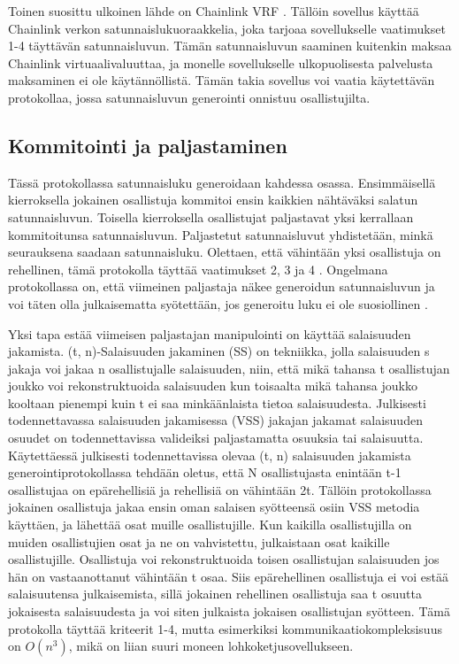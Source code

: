 \documentclass{article}
\begin{document}
Toinen suosittu ulkoinen lähde on Chainlink VRF \cite{noauthor_verifiable_2020}. Tällöin sovellus käyttää Chainlink verkon satunnaislukuoraakkelia, joka tarjoaa sovellukselle vaatimukset 1-4 täyttävän satunnaisluvun. Tämän satunnaisluvun saaminen kuitenkin maksaa Chainlink virtuaalivaluuttaa, ja monelle sovellukselle ulkopuolisesta palvelusta maksaminen ei ole käytännöllistä. Tämän takia sovellus voi vaatia käytettävän protokollaa, jossa satunnaisluvun generointi onnistuu osallistujilta.

\subsection{Kommitointi ja paljastaminen}
Tässä protokollassa satunnaisluku generoidaan kahdessa osassa. Ensimmäisellä kierroksella jokainen osallistuja kommitoi ensin kaikkien nähtäväksi salatun satunnaisluvun. Toisella kierroksella osallistujat paljastavat yksi kerrallaan kommitoitunsa satunnaisluvun. Paljastetut satunnaisluvut yhdistetään, minkä seurauksena saadaan satunnaisluku. Olettaen, että vähintään yksi osallistuja on rehellinen, tämä protokolla täyttää vaatimukset 2, 3 ja 4 \cite{simic_review_2020}. Ongelmana protokollassa on, että viimeinen paljastaja näkee generoidun satunnaisluvun ja voi täten olla julkaisematta syötettään, jos generoitu luku ei ole suosiollinen \cite{simic_review_2020}.

Yksi tapa estää viimeisen paljastajan manipulointi on käyttää salaisuuden jakamista. (t, n)-Salaisuuden jakaminen (SS) on tekniikka, jolla salaisuuden s jakaja voi jakaa n osallistujalle salaisuuden, niin, että mikä tahansa t osallistujan joukko voi rekonstruktuoida salaisuuden kun toisaalta mikä tahansa joukko kooltaan pienempi kuin t ei saa minkäänlaista tietoa salaisuudesta\cite{syta_scalable_2017}. Julkisesti todennettavassa salaisuuden jakamisessa (VSS) jakajan jakamat salaisuuden osuudet on todennettavissa valideiksi paljastamatta osuuksia tai salaisuutta. Käytettäessä julkisesti todennettavissa olevaa (t, n) salaisuuden jakamista generointiprotokollassa tehdään oletus, että N osallistujasta enintään t-1 osallistujaa on epärehellisiä ja rehellisiä on vähintään 2t. Tällöin protokollassa jokainen osallistuja jakaa ensin oman salaisen syötteensä osiin VSS metodia käyttäen, ja lähettää osat muille osallistujille. Kun kaikilla osallistujilla on muiden osallistujien osat ja ne on vahvistettu, julkaistaan osat kaikille osallistujille. Osallistuja voi rekonstruktuoida toisen osallistujan salaisuuden jos hän on vastaanottanut vähintään t osaa. Siis epärehellinen osallistuja ei voi estää salaisuutensa julkaisemista, sillä jokainen rehellinen osallistuja saa t osuutta jokaisesta salaisuudesta ja voi siten julkaista jokaisen osallistujan syötteen. Tämä protokolla täyttää kriteerit 1-4, mutta esimerkiksi kommunikaatiokompleksisuus on $O(n^3)$, mikä on liian suuri moneen lohkoketjusovellukseen.
\end{document}
